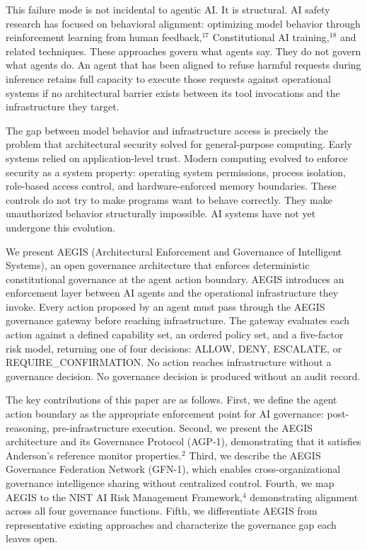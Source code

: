 \documentclass{IEEEcsmag}
\begin{document}
This failure mode is not incidental to agentic AI. It is structural. AI safety research has focused on behavioral alignment: optimizing model behavior through reinforcement learning from human feedback,$^{17}$ Constitutional AI training,$^{18}$ and related techniques. These approaches govern what agents say. They do not govern what agents do. An agent that has been aligned to refuse harmful requests during inference retains full capacity to execute those requests against operational systems if no architectural barrier exists between its tool invocations and the infrastructure they target.

The gap between model behavior and infrastructure access is precisely the problem that architectural security solved for general-purpose computing. Early systems relied on application-level trust. Modern computing evolved to enforce security as a system property: operating system permissions, process isolation, role-based access control, and hardware-enforced memory boundaries. These controls do not try to make programs want to behave correctly. They make unauthorized behavior structurally impossible. AI systems have not yet undergone this evolution.

We present AEGIS (Architectural Enforcement and Governance of Intelligent Systems), an open governance architecture that enforces deterministic constitutional governance at the agent action boundary. AEGIS introduces an enforcement layer between AI agents and the operational infrastructure they invoke. Every action proposed by an agent must pass through the AEGIS governance gateway before reaching infrastructure. The gateway evaluates each action against a defined capability set, an ordered policy set, and a five-factor risk model, returning one of four decisions: ALLOW, DENY, ESCALATE, or REQUIRE\_CONFIRMATION. No action reaches infrastructure without a governance decision. No governance decision is produced without an audit record.

The key contributions of this paper are as follows. First, we define the agent action boundary as the appropriate enforcement point for AI governance: post-reasoning, pre-infrastructure execution. Second, we present the AEGIS architecture and its Governance Protocol (AGP-1), demonstrating that it satisfies Anderson's reference monitor properties.$^{2}$ Third, we describe the AEGIS Governance Federation Network (GFN-1), which enables cross-organizational governance intelligence sharing without centralized control. Fourth, we map AEGIS to the NIST AI Risk Management Framework,$^{4}$ demonstrating alignment across all four governance functions. Fifth, we differentiate AEGIS from representative existing approaches and characterize the governance gap each leaves open.
\end{document}
